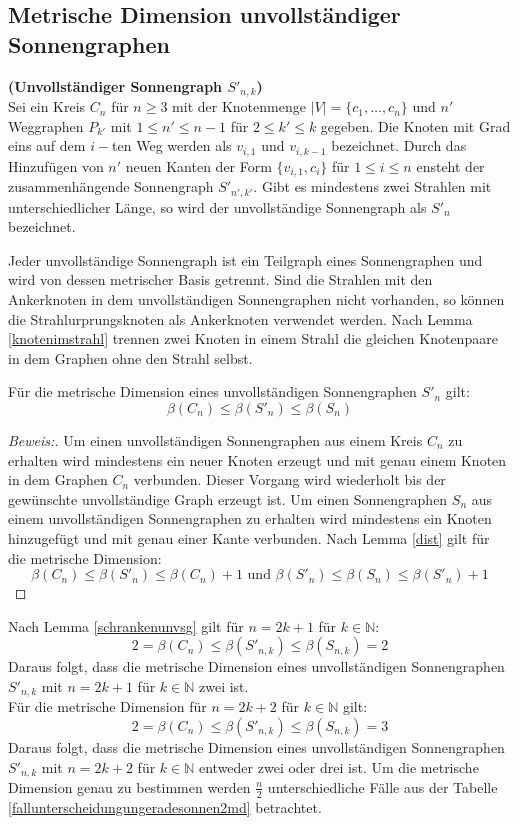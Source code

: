 \subsection{Metrische Dimension unvollständiger Sonnengraphen}  	
\label{chap_usonne} 
\begin{defi}{\textbf{(Unvollständiger Sonnengraph $S'_{n,k}$)}}\\
Sei ein Kreis $C_n$ für $n \geq 3$ mit der Knotenmenge $|V|=\{ c_1, \ldots , c_n \}$ und $n'$ Weggraphen $P_{k'}$ mit $1 \leq n' \leq n-1$ für $2 \leq k' \leq k$ gegeben. Die Knoten mit Grad eins auf dem $i-$ten Weg werden als $v_{i,1}$ und $v_{i,k-1}$ bezeichnet. Durch das Hinzufügen von $n'$ neuen Kanten der Form $\{v_{i,1},c_i\}$ für $1 \leq i \leq n$ ensteht der zusammenhängende Sonnengraph $S'_{n',k'}$. Gibt es mindestens zwei Strahlen mit unterschiedlicher Länge, so wird der unvollständige Sonnengraph als $S'_n$ bezeichnet. 
\end{defi}
\begin{bem}
\label{bemsonne}
Jeder unvollständige Sonnengraph ist ein Teilgraph eines Sonnengraphen und wird von dessen metrischer Basis getrennt. Sind die Strahlen mit den Ankerknoten in dem unvollständigen Sonnengraphen nicht vorhanden, so können die Strahlurprungsknoten als Ankerknoten verwendet werden. Nach Lemma \ref{knotenimstrahl} trennen zwei Knoten in einem Strahl die gleichen Knotenpaare in dem Graphen ohne den Strahl selbst.
\end{bem}
\begin{lem}
\label{schrankenunvsg}
Für die metrische Dimension eines unvollständigen Sonnengraphen $S'_{n}$ gilt:
$$\beta(C_n) \leq \beta(S'_{n})\leq \beta(S_{n})$$
\end{lem}
\begin{proof}[Beweis:]
Um einen unvollständigen Sonnengraphen aus einem Kreis $C_n$ zu erhalten wird mindestens ein neuer Knoten erzeugt und mit genau einem Knoten in dem Graphen $C_n$ verbunden. Dieser Vorgang wird wiederholt bis der gewünschte unvollständige Graph erzeugt ist. Um einen Sonnengraphen $S_{n}$ aus einem unvollständigen Sonnengraphen zu erhalten wird mindestens ein Knoten hinzugefügt und mit genau einer Kante verbunden. Nach Lemma \ref{dist} gilt für die metrische Dimension:
$$\beta(C_n)  \leq \beta(S'_{n}) \leq \beta(C_n) +1 \text{ und } \beta(S'_{n}) \leq \beta(S_n) \leq \beta(S'_{n})+1$$
\end{proof}
\begin{bem}
Nach Lemma \ref{schrankenunvsg} gilt für $n=2k+1$ für $k \in \mathbb{N}$: $$2=\beta(C_n) \leq \beta(S'_{n,k})\leq \beta(S_{n,k})=2$$
Daraus folgt, dass die metrische Dimension eines unvollständigen Sonnengraphen $S'_{n,k}$ mit $n=2k+1$ für $k \in \mathbb{N}$ zwei ist.\\
Für die metrische Dimension für $n=2k+2$ für $k \in \mathbb{N}$ gilt: $$2=\beta(C_n) \leq \beta(S'_{n,k})\leq \beta(S_{n,k})=3$$
Daraus folgt, dass die metrische Dimension eines unvollständigen Sonnengraphen $S'_{n,k}$ mit $n=2k+2$ für $k \in \mathbb{N}$ entweder zwei oder drei ist. Um die metrische Dimension genau zu bestimmen werden $\frac{n}{2}$ unterschiedliche Fälle aus der Tabelle \ref{fallunterscheidungungeradesonnen2md} betrachtet.
\end{bem}
